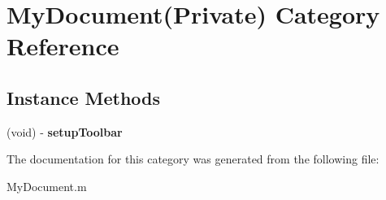 \hypertarget{category_my_document_07_private_08}{}\section{My\+Document(Private) Category Reference}
\label{category_my_document_07_private_08}
\subsection*{Instance Methods}
\begin{DoxyCompactItemize}
\item 
\mbox{\label{category_my_document_07_private_08_a49cdfb912b0949a6929aacfb8291a2fa}} 
(void) -\/ {\bfseries setup\+Toolbar}
\end{DoxyCompactItemize}


The documentation for this category was generated from the following file\+:\begin{DoxyCompactItemize}
\item 
My\+Document.\+m\end{DoxyCompactItemize}
